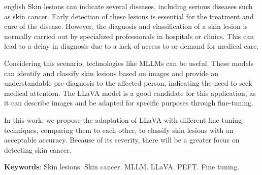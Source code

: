 \begin{resumo}[Abstract]
	\SingleSpacing
	\begin{otherlanguage*}{english}
		Skin lesions can indicate several diseases, including serious diseases such as skin cancer. Early detection of these lesions is essential for the treatment
		and cure of the disease. However, the diagnosis and classification of a skin lesion is normally carried out by specialized professionals in hospitals or clinics.
		This can lead to a delay in diagnosis due to a lack of access to or demand for medical care.

		Considering this scenario, technologies like \ac{MLLMs} can be useful. These models can identify and classify skin lesions based on images and provide an
		understandable pre-diagnosis to the affected person, indicating the need to seek medical attention. The \ac{LLaVA} model  is a good candidate for this
		application, as it can describe images and be adapted for specific purposes through fine-tuning.

		In this work, we propose the adaptation of \ac{LLaVA} with different fine-tuning techniques, comparing them to each other, to classify skin lesions with an
		acceptable accuracy. Because of its severity, there will be a greater focus on detecting skin cancer.

		\textbf{Keywords}: Skin lesions. Skin cancer. MLLM. LLaVA. PEFT. Fine tuning.
	\end{otherlanguage*}
\end{resumo}

{
\hypersetup{hidelinks}

\imprimirlistadesiglas

\tableofcontents*
\cleardoublepage
}
